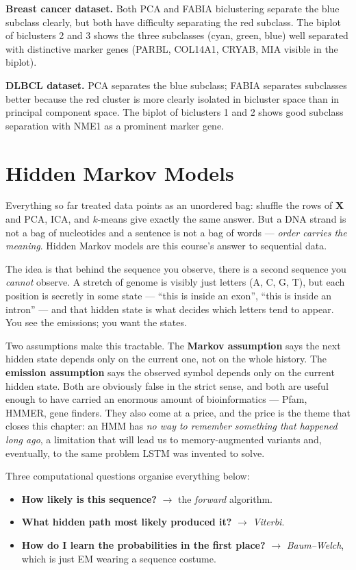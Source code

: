 \documentclass[11pt, oneside]{book}
\begin{document}
\textbf{Breast cancer dataset.}
Both PCA and FABIA biclustering separate the blue subclass clearly, but both have difficulty
separating the red subclass.
The biplot of biclusters 2 and 3 shows the three subclasses (cyan, green, blue) well separated
with distinctive marker genes (PARBL, COL14A1, CRYAB, MIA visible in the biplot).

\textbf{DLBCL dataset.}
PCA separates the blue subclass; FABIA separates subclasses better because the red cluster
is more clearly isolated in bicluster space than in principal component space.
The biplot of biclusters 1 and 2 shows good subclass separation with NME1 as a prominent
marker gene.


\chapter{Hidden Markov Models}

Everything so far treated data points as an unordered bag: shuffle the rows of
$\bm{X}$ and PCA, ICA, and $k$-means give exactly the same answer.
But a DNA strand is not a bag of nucleotides and a sentence is not a bag of words
--- \emph{order carries the meaning}.
Hidden Markov models are this course's answer to sequential data.

The idea is that behind the sequence you observe, there is a second sequence you
\emph{cannot} observe.
A stretch of genome is visibly just letters (A, C, G, T), but each position is
secretly in some state --- ``this is inside an exon'', ``this is inside an
intron'' --- and that hidden state is what decides which letters tend to appear.
You see the emissions; you want the states.

Two assumptions make this tractable.
The \textbf{Markov assumption} says the next hidden state depends only on the
current one, not on the whole history.
The \textbf{emission assumption} says the observed symbol depends only on the
current hidden state.
Both are obviously false in the strict sense, and both are useful enough to have
carried an enormous amount of bioinformatics --- Pfam, HMMER, gene finders.
They also come at a price, and the price is the theme that closes this chapter:
an HMM has \emph{no way to remember something that happened long ago}, a
limitation that will lead us to memory-augmented variants and, eventually, to the
same problem LSTM was invented to solve.

Three computational questions organise everything below:
\begin{itemize}
  \item \textbf{How likely is this sequence?} $\to$ the \emph{forward} algorithm.
  \item \textbf{What hidden path most likely produced it?} $\to$ \emph{Viterbi}.
  \item \textbf{How do I learn the probabilities in the first place?} $\to$
        \emph{Baum--Welch}, which is just EM wearing a sequence costume.
\end{itemize}
\end{document}
